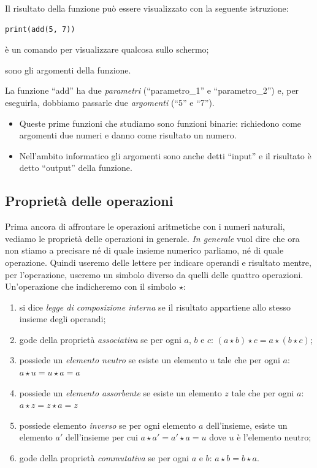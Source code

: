 Il risultato della funzione può essere visualizzato con la seguente 
istruzione:
\begin{lstlisting}
print(add(5, 7))
\end{lstlisting}
\begin{description} [nosep]
\item [\textbf{``print''}] è un comando per visualizzare qualcosa sullo 
schermo;
\item [\textbf{``5'' e ``7''}] sono gli argomenti della funzione. 
\end{description}
La funzione ``add'' ha due \emph{parametri} 
(``parametro\_1'' e ``parametro\_2'') e, per eseguirla, 
dobbiamo passarle due \emph{argomenti} (``5'' e ``7'').

\begin{osservazioni}{}{}
\begin{itemize} [nosep]
\item Queste prime funzioni che studiamo sono funzioni binarie: richiedono 
come argomenti due numeri e danno come risultato un numero.
\item Nell'ambito informatico gli argomenti sono anche detti ``input'' e il 
risultato è detto ``output'' della funzione.
\end{itemize}
\end{osservazioni}

\subsection{Proprietà delle operazioni}

Prima ancora di affrontare le operazioni aritmetiche con i numeri naturali, 
vediamo le proprietà delle operazioni in generale. \emph{In generale} vuol 
dire che ora non stiamo a precisare né di quale insieme numerico parliamo, 
né di quale operazione. Quindi useremo delle lettere per indicare  
operandi e  risultato mentre, per l'operazione, useremo un simbolo diverso 
da quelli delle quattro operazioni. Un'operazione che indicheremo con il 
simbolo \(\star\):

\begin{enumerate} [noitemsep]
 \item si dice \emph{legge di composizione interna} se
  il risultato appartiene allo stesso insieme degli operandi;
 \item gode della proprietà \emph{associativa} se per ogni 
  \(a\), \(b\) e \(c\): 
  \((a \star b) \star c = a \star (b \star c)\);
 \item possiede un \emph{elemento neutro} se esiste un elemento \(u\) 
  tale che per ogni \(a\): \(a \star u = u \star a = a\)
 \item possiede un \emph{elemento assorbente} se esiste un elemento \(z\) 
  tale che per ogni \(a\): \(a \star z = z \star a = z\)
 \item possiede elemento \emph{inverso} se per ogni
  elemento \(a\) dell'insieme, esiste un elemento \(a'\) 
  dell'insieme per cui \(a \star a' = a' \star a = u\) dove \(u\) è 
  l'elemento neutro;
 \item gode della proprietà \emph{commutativa} se per ogni \(a\) e \(b\): 
  \(a \star b = b \star a\).
\end{enumerate}

